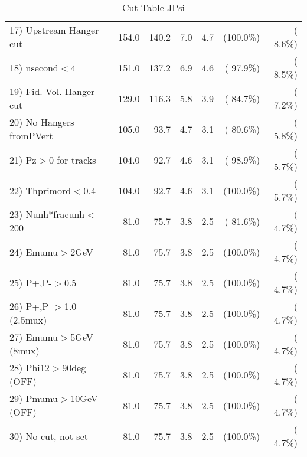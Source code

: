 \begin{table}[h!]
\begin{tabular}{||l||r|r|r|r|r|r||}
 17) Upstream Hanger cut  &        154.0 &        140.2 &          7.0 &          4.7 & (100.0\%) & (  8.6\%) \\
 18) nsecond$<$4          &        151.0 &        137.2 &          6.9 &          4.6 & ( 97.9\%) & (  8.5\%) \\
 19) Fid. Vol. Hanger cut &        129.0 &        116.3 &          5.8 &          3.9 & ( 84.7\%) & (  7.2\%) \\
 20) No Hangers fromPVert &        105.0 &         93.7 &          4.7 &          3.1 & ( 80.6\%) & (  5.8\%) \\
 21) Pz$>$0 for tracks    &        104.0 &         92.7 &          4.6 &          3.1 & ( 98.9\%) & (  5.7\%) \\
 22) Thprimord$<$0.4      &        104.0 &         92.7 &          4.6 &          3.1 & (100.0\%) & (  5.7\%) \\
 23) Nunh*fracunh$<$200   &         81.0 &         75.7 &          3.8 &          2.5 & ( 81.6\%) & (  4.7\%) \\
 24) Emumu$>$2GeV         &         81.0 &         75.7 &          3.8 &          2.5 & (100.0\%) & (  4.7\%) \\
 25) P+,P-$>$0.5          &         81.0 &         75.7 &          3.8 &          2.5 & (100.0\%) & (  4.7\%) \\
 26) P+,P-$>$1.0 (2.5mux) &         81.0 &         75.7 &          3.8 &          2.5 & (100.0\%) & (  4.7\%) \\
 27) Emumu$>$5GeV  (8mux) &         81.0 &         75.7 &          3.8 &          2.5 & (100.0\%) & (  4.7\%) \\
 28) Phi12$>$90deg  (OFF) &         81.0 &         75.7 &          3.8 &          2.5 & (100.0\%) & (  4.7\%) \\
 29) Pmumu$>$10GeV  (OFF) &         81.0 &         75.7 &          3.8 &          2.5 & (100.0\%) & (  4.7\%) \\
 30) No cut, not set      &         81.0 &         75.7 &          3.8 &          2.5 & (100.0\%) & (  4.7\%) \\
 \hline
 \hline
 \end{tabular}
 \caption{Cut Table  JPsi     }
 \label{tab-cutcohjpsi-mumu_cohrhop}
 \end{table}
